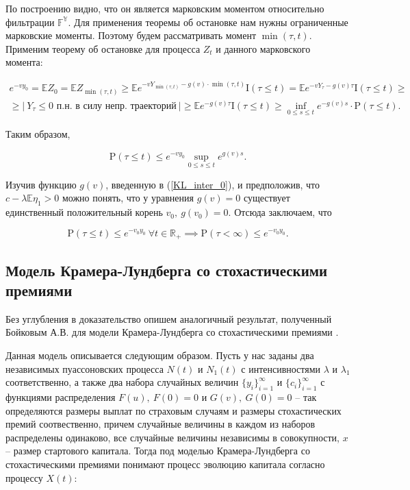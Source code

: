 \documentclass{article}
\theoremstyle{plain}
\theoremstyle{plain}
\theoremstyle{plain}
\theoremstyle{plain}
\theoremstyle{definition}
\theoremstyle{remark}
\begin{document}
По построению видно, что он является марковским моментом относительно фильтрации $\mathbb{F^Y}$. Для применения теоремы об остановке нам нужны ограниченные марковские моменты. Поэтому будем рассматривать момент $\min (\tau, t)$. Применим теорему об остановке для процесса $Z_t$ и данного марковского момента:

\begin{equation}
\begin{aligned}
    e^{-v y_0} = \mathbb{E} Z_0 = \mathbb{E} Z_{\min (\tau, t)} \geq \mathbb{E} e^{-v Y_{\min (\tau, t)} - g(v) \cdot \min (\tau, t)} \mathrm{I} (\tau \leq t) = \mathbb{E} e^{-v Y_\tau - g(v) \tau} \mathrm{I} (\tau \leq t) \geq \\
    \geq |\ Y_\tau \leq 0 \text{ п.н. в силу непр. траекторий}\ | \geq \mathbb{E} e^{-g(v) \tau} \mathrm{I} (\tau \leq t) \geq \displaystyle \inf_{0 \leq s \leq t} e^{-g(v)s} \cdot \mathrm{P}(\tau \leq t).
\end{aligned}
\end{equation}

Таким образом,

\begin{equation}
    \mathrm{P} (\tau \leq t) \leq e^{-v y_0} \sup_{0 \leq s \leq t} e^{g(v)s}.
\end{equation}

Изучив функцию $g(v)$, введенную в (\ref{KL_inter_0}), и предположив, что $c - \lambda \mathbb{E} \eta_1 > 0$ можно понять, что у уравнения $g(v) = 0$ существует единственный положительный корень $v_0,\ g(v_0) = 0$. Отсюда заключаем, что

\begin{equation}
\label{KLDefaultUpperEstimation}
    \mathrm{P} (\tau \leq t) \leq e^{-v_0 y_0}\ \forall t \in \mathbb{R}_+ \implies \mathrm{P} (\tau < \infty) \leq e^{-v_0 y_0}.
\end{equation}

\subsection{Модель Крамера-Лундберга со стохастическими премиями}

Без углубления в доказательство опишем аналогичный результат, полученный Бойковым А.В. для модели Крамера-Лундберга со стохастическими премиями \cite{KL_premium}.

Данная модель описывается следующим образом. Пусть у нас заданы два независимых пуассоновских процесса $N(t)$ и $N_1(t)$ с интенсивностями $\lambda$ и $\lambda_1$ соответственно, а также два набора случайных величин $\{ y_i \}_{i = 1}^{\infty}$ и $\{ c_i \}_{i = 1}^{\infty}$ с функциями распределения $F(u),\ F(0) = 0$ и $G(v),\ G(0) = 0$ -- так определяются размеры выплат по страховым случаям и размеры стохастических премий соотвественно, причем случайные величины в каждом из наборов распределены одинаково, все случайные величины независимы в совокупности, $x$ -- размер стартового капитала. Тогда под моделью Крамера-Лундберга со стохастическими премиями понимают процесс эволюцию капитала согласно процессу $X(t)$:
\end{document}
